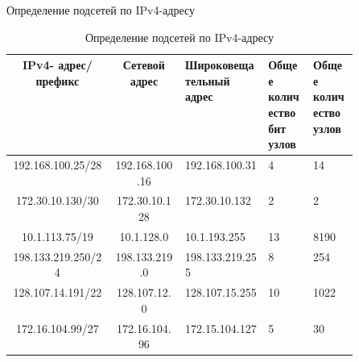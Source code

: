 \documentclass[a4paper,14pt]{extarticle}
\begin{document}
\begin{mypart}{Определение подсетей по IPv4-адресу}
	
	\begin{table}[htbp]
		\small
		\centering
		\caption{Определение подсетей по IPv4-адресу}
		\begin{tabular}{|c|c|p{0.24\linewidth}|p{0.13\linewidth}|p{0.13\linewidth}|}
			\hline
			
			\textbf{IPv4-
			адрес/префикс} & 
			
			\textbf{Сетевой адрес} & 
			\textbf{Широковещательный адрес} & \textbf{Общее количество бит узлов}& \textbf{Общее количество узлов} \\ \hline
			192.168.100.25/28 & 192.168.100.16 & 192.168.100.31 & 4 & 14 \\ \hline
			172.30.10.130/30 & 172.30.10.128 & 172.30.10.132 & 2 & 2 \\ \hline
			10.1.113.75/19 & 10.1.128.0 & 10.1.193.255 & 13 & 8190 \\ \hline
			198.133.219.250/24 & 198.133.219.0 & 198.133.219.255 & 8 & 254 \\ \hline
			128.107.14.191/22 & 128.107.12.0 & 128.107.15.255 & 10 & 1022 \\ \hline
			172.16.104.99/27 & 172.16.104.96 & 172.15.104.127 & 5 & 30 \\ \hline
		\end{tabular}
		\label{tab:subnets}
	\end{table}
	
\end{mypart}
\end{document}
